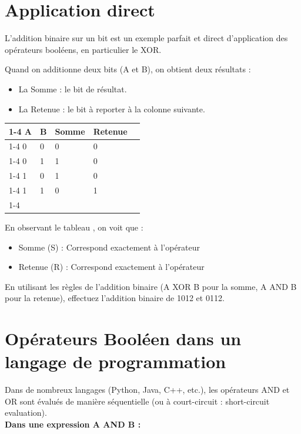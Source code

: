 \section{Application direct}
L'addition binaire sur un bit est un exemple parfait et direct d'application des opérateurs booléens, en particulier le XOR.

Quand on additionne deux bits (A et B), on obtient deux résultats :
\begin{itemize}
    \item La Somme : le bit de résultat.
   \item La Retenue : le bit à reporter à la colonne suivante.
\end{itemize}
\begin{center}
\begin{tabular}{|l|l|l|l|l}
\cline{1-4}
A & B & Somme & Retenue &  \\ \cline{1-4}
0 & 0 & 0     & 0       &  \\ \cline{1-4}
0 & 1 & 1     & 0       &  \\ \cline{1-4}
1 & 0 & 1     & 0       &  \\ \cline{1-4}
1 & 1 & 0     & 1       &  \\ \cline{1-4}
\end{tabular}
\end{center}
En observant le tableau , on voit que :
\begin{itemize}
    \item Somme (S) : Correspond exactement à l'opérateur 
    \item Retenue (R) : Correspond exactement à l'opérateur 
\end{itemize}

\begin{Avous}
    En utilisant les règles de l'addition binaire (A XOR B pour la somme, A AND B pour la retenue), effectuez l'addition binaire de 1012 et 0112.
    \vspace{5cm}
\end{Avous}

\section{Opérateurs Booléen dans un langage de programmation}
Dans de nombreux langages (Python, Java, C++, etc.), les opérateurs AND et OR sont évalués de manière séquentielle (ou à court-circuit : short-circuit evaluation).\\

\textbf{Dans une expression A AND B :}\\

